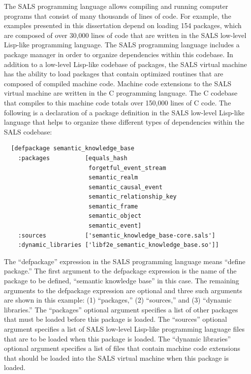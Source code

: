 The SALS programming language allows compiling and running computer
programs that consist of many thousands of lines of code.  For
example, the examples presented in this dissertation depend on loading
154 packages, which are composed of over 30,000 lines of code that are
written in the SALS low-level Lisp-like programming language.  The
SALS programming language includes a package manager in order to
organize dependencies within this codebase.  In addition to a
low-level Lisp-like codebase of packages, the SALS virtual machine has
the ability to load packages that contain optimized routines that are
composed of compiled machine code.  Machine code extensions to the
SALS virtual machine are written in the C programming language.  The C
codebase that compiles to this machine code totals over 150,000 lines
of C code.  The following is a declaration of a package definition in
the SALS low-level Lisp-like language that helps to organize these
different types of dependencies within the SALS codebase:
\begin{samepage}
\begin{Verbatim}
  [defpackage semantic_knowledge_base
    :packages          [equals_hash
                        forgetful_event_stream
                        semantic_realm
                        semantic_causal_event
                        semantic_relationship_key
                        semantic_frame
                        semantic_object
                        semantic_event]
    :sources           ['semantic_knowledge_base-core.sals']
    :dynamic_libraries ['libf2e_semantic_knowledge_base.so']]
\end{Verbatim}
\end{samepage}
The ``defpackage'' expression in the SALS programming language means
``define package.''  The first argument to the defpackage expression
is the name of the package to be defined, ``semantic knowledge base''
in this case.  The remaining arguments to the defpackage expression
are optional and three such arguments are shown in this example: (1)
``packages,'' (2) ``sources,'' and (3) ``dynamic libraries.''  The
``packages'' optional argument specifies a list of other packages that
must be loaded before this package is loaded.  The ``sources''
optional argument specifies a list of SALS low-level Lisp-like
programming language files that are to be loaded when this package is
loaded.  The ``dynamic libraries'' optional argument specifies a list
of files that contain machine code extensions that should be loaded
into the SALS virtual machine when this package is loaded.


